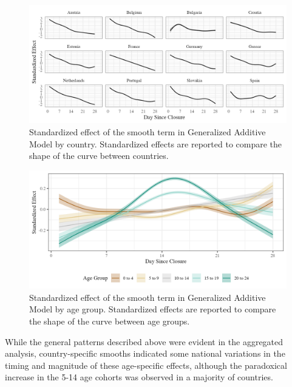 \documentclass[]{interact}
\theoremstyle{plain}%
\theoremstyle{definition}
\theoremstyle{remark}
\begin{document}
\begin{figure}
\includegraphics[width=\textwidth]{manuscript_blind_files/figure-latex/country-1} \caption{Standardized effect of the smooth term in Generalized Additive Model by country. Standardized effects are reported to compare the shape of the curve between countries.}\label{fig:country}
\end{figure}

\begin{figure}
\includegraphics[width=\textwidth]{manuscript_blind_files/figure-latex/age-1} \caption{Standardized effect of the smooth term in Generalized Additive Model by age group. Standardized effects are reported to compare the shape of the curve between age groups.}\label{fig:age}
\end{figure}

While the general patterns described above were evident in the aggregated analysis, country-specific smooths indicated some national variations in the timing and magnitude of these age-specific effects, although the paradoxical increase in the 5-14 age cohorts was observed in a majority of countries.
\end{document}
